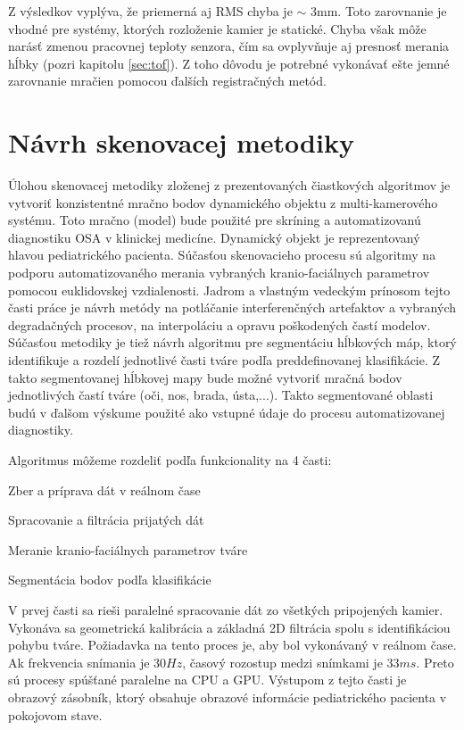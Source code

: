 Z výsledkov vyplýva, že priemerná aj RMS chyba je $\sim $ 3mm. Toto zarovnanie je vhodné pre systémy, ktorých rozloženie kamier je statické. Chyba však môže narásť zmenou pracovnej teploty senzora, čím sa ovplyvňuje aj presnosť merania hĺbky (pozri kapitolu \ref{sec:tof}). Z toho dôvodu je potrebné vykonávať ešte jemné zarovnanie mračien pomocou ďalších registračných metód.

\section{Návrh skenovacej metodiky}

Úlohou skenovacej metodiky zloženej z prezentovaných čiastkových algoritmov je vytvoriť konzistentné mračno bodov dynamického objektu z multi-kamerového systému. Toto mračno (model) bude použité pre skríning a automatizovanú diagnostiku OSA v klinickej medicíne. Dynamický objekt je reprezentovaný hlavou pediatrického pacienta. Súčasťou skenovacieho procesu sú algoritmy na podporu automatizovaného merania vybraných kranio-faciálnych parametrov pomocou euklidovskej vzdialenosti. Jadrom a vlastným vedeckým prínosom tejto časti práce je návrh metódy na potláčanie interferenčných artefaktov a vybraných degradačných procesov, na interpoláciu a opravu poškodených častí modelov. Súčasťou metodiky je tiež návrh algoritmu pre segmentáciu hĺbkových máp, ktorý identifikuje a rozdelí jednotlivé časti tváre podľa preddefinovanej klasifikácie.
Z takto segmentovanej hĺbkovej mapy bude možné vytvoriť mračná bodov jednotlivých častí tváre (oči, nos, brada, ústa,...). Takto segmentované oblasti budú v ďalšom výskume použité ako vstupné údaje do procesu automatizovanej diagnostiky. \newline

\noindent Algoritmus môžeme rozdeliť podľa funkcionality na 4 časti: \newline

\begin{compactitem}
	\item Zber a príprava dát v reálnom čase
	\item Spracovanie a filtrácia prijatých dát
	\item Meranie kranio-faciálnych parametrov tváre 
	\item Segmentácia bodov podľa klasifikácie \newline
\end{compactitem}

V prvej časti sa rieši paralelné spracovanie dát zo všetkých pripojených kamier. Vykonáva sa geometrická kalibrácia a základná 2D filtrácia spolu s identifikáciou pohybu tváre. Požiadavka na tento proces je, aby bol vykonávaný v reálnom čase. Ak frekvencia snímania je $30Hz$, časový rozostup medzi snímkami je $33ms$. Preto sú procesy spúšťané paralelne na CPU a GPU. Výstupom z tejto časti je obrazový zásobník, ktorý obsahuje obrazové informácie pediatrického pacienta v pokojovom stave. \newline

